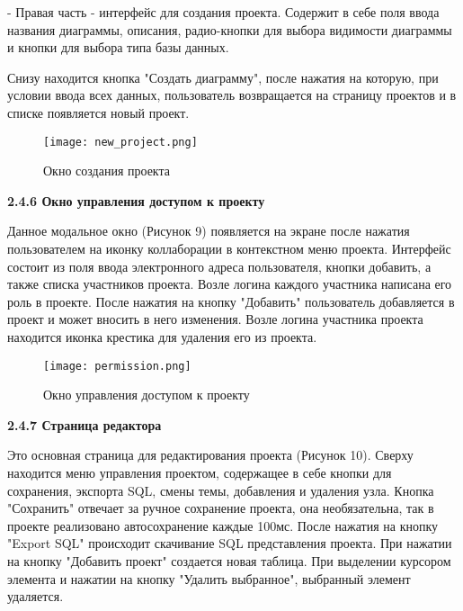     - Правая часть - интерфейс для создания проекта. Содержит в себе поля ввода названия диаграммы, описания, радио-кнопки для выбора видимости диаграммы и кнопки для выбора типа базы данных.
    
Снизу находится кнопка "Создать диаграмму", после нажатия на которую, при условии ввода всех данных, пользователь возвращается на страницу проектов и в списке появляется новый проект.

\renewcommand{\figurename}{Рисунок}
\begin{figure}[htbp]
    \centering %
    \texttt{[image: new\_project.png]}
    \caption{Окно создания проекта}
    \label{fig:analyze} %
\end{figure}

\newpage

\textbf{\large 2.4.6 Окно управления доступом к проекту}

Данное модальное окно (Рисунок 9) появляется на экране после нажатия пользователем на иконку коллаборации в контекстном меню проекта. Интерфейс состоит из поля ввода электронного адреса пользователя, кнопки добавить, а также списка участников проекта. Возле логина каждого участника написана его роль в проекте. После нажатия на кнопку "Добавить" пользователь добавляется в проект и может вносить в него изменения. Возле логина участника проекта находится иконка крестика для удаления его из проекта.
    
\renewcommand{\figurename}{Рисунок}
\begin{figure}[htbp]
    \centering %
    \texttt{[image: permission.png]}
    \caption{Окно управления доступом к проекту}
    \label{fig:analyze} %
\end{figure}

\newpage

\textbf{\large 2.4.7 Страница редактора}

Это основная страница для редактирования проекта (Рисунок 10). Сверху находится меню управления проектом, содержащее в себе кнопки для сохранения, экспорта SQL, смены темы, добавления и удаления узла. Кнопка "Сохранить" отвечает за ручное сохранение проекта, она необязательна, так в проекте реализовано автосохранение каждые 100мс. После нажатия на кнопку "Export SQL" происходит скачивание SQL представления проекта. При нажатии на кнопку "Добавить проект" создается новая таблица. При выделении курсором элемента и нажатии на кнопку "Удалить выбранное", выбранный элемент удаляется.

